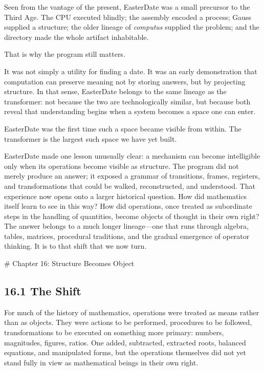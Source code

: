 \documentclass[
]{article}
\begin{document}
Seen from the vantage of the present, EasterDate was a small precursor
to the Third Age. The CPU executed blindly; the assembly encoded a
process; Gauss supplied a structure; the older lineage of
\emph{computus} supplied the problem; and the directory made the whole
artifact inhabitable.

That is why the program still matters.

It was not simply a utility for finding a date. It was an early
demonstration that computation can preserve meaning not by storing
answers, but by projecting structure. In that sense, EasterDate belongs
to the same lineage as the transformer: not because the two are
technologically similar, but because both reveal that understanding
begins when a system becomes a space one can enter.

EasterDate was the first time such a space became visible from within.
The transformer is the largest such space we have yet built.

EasterDate made one lesson unusually clear: a mechanism can become
intelligible only when its operations become visible as structure. The
program did not merely produce an answer; it exposed a grammar of
transitions, frames, registers, and transformations that could be
walked, reconstructed, and understood. That experience now opens onto a
larger historical question. How did mathematics itself learn to see in
this way? How did operations, once treated as subordinate steps in the
handling of quantities, become objects of thought in their own right?
The answer belongs to a much longer lineage---one that runs through
algebra, tables, matrices, procedural traditions, and the gradual
emergence of operator thinking. It is to that shift that we now turn.

\newpage
\vspace*{3cm}
\begin{center}
# Chapter 16: Structure Becomes Object
\end{center}

\hypertarget{the-shift}{%
\subsection{16.1 The Shift}\label{the-shift}}

For much of the history of mathematics, operations were treated as means
rather than as objects. They were actions to be performed, procedures to
be followed, transformations to be executed on something more primary:
numbers, magnitudes, figures, ratios. One added, subtracted, extracted
roots, balanced equations, and manipulated forms, but the operations
themselves did not yet stand fully in view as mathematical beings in
their own right.
\end{document}
